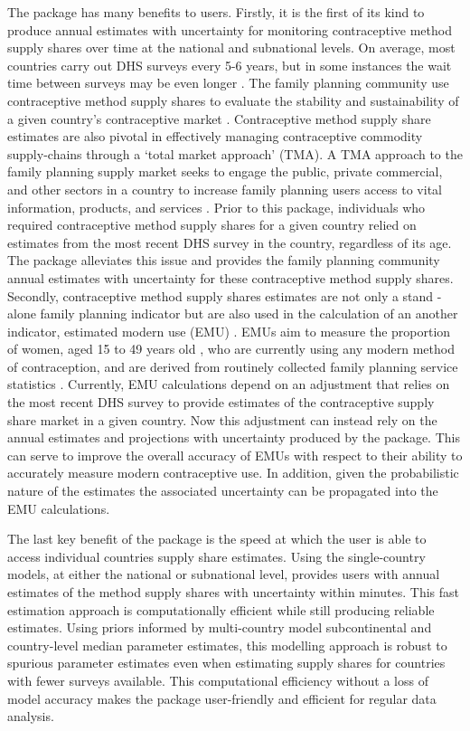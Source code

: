 The  package has many benefits to users. Firstly, it is the first of its kind to produce annual estimates with uncertainty for monitoring contraceptive method supply shares over time at the national and subnational levels. On average, most countries carry out DHS surveys every 5-6 years, but in some instances the wait time between surveys may be even longer \citep{DHSTypes}. The family planning community use contraceptive method supply shares to evaluate the stability and sustainability of a given country's contraceptive market \citep{Bradley2022}. Contraceptive method supply share estimates are also pivotal in effectively managing contraceptive commodity supply-chains through a `total market approach' (TMA). A TMA approach to the family planning supply market seeks to engage the public, private commercial, and other sectors in a country to increase family planning users access to vital information, products, and services \citep{Moazzam2015, SHOPSTMA2016}. Prior to this package, individuals who required contraceptive method supply shares for a given country relied on estimates from the most recent DHS survey in the country, regardless of its age. The  package alleviates this issue and provides the family planning community annual estimates with uncertainty for these contraceptive method supply shares. Secondly, contraceptive method supply shares estimates are not only a stand -alone family planning indicator but are also used in the calculation of an another indicator, estimated modern use (EMU) \citep{Track20}. EMUs aim to measure the proportion of women, aged 15 to 49 years old , who are currently using any modern method of contraception, and are derived from routinely collected family planning service statistics \citep{Track20MonitoringEMUs}. Currently, EMU calculations depend on an adjustment that relies on the most recent DHS survey to provide estimates of the contraceptive supply share market in a given country. Now this adjustment can instead rely on the annual estimates and projections with uncertainty produced by the  package. This can serve to improve the overall accuracy of EMUs with respect to their ability to accurately measure modern contraceptive use. In addition, given the probabilistic nature of the  estimates the associated uncertainty can be propagated into the EMU calculations.

The last key benefit of the  package is the speed at which the user is able to access individual countries supply share estimates. Using the single-country models, at either the national or subnational level, provides users with annual estimates of the method supply shares with uncertainty within minutes. This fast estimation approach is computationally efficient while still producing reliable estimates. Using priors informed by multi-country model subcontinental and country-level median parameter estimates, this modelling approach is robust to spurious parameter estimates even when estimating supply shares for countries with fewer surveys available. This computational efficiency without a loss of model accuracy makes the  package user-friendly and efficient for regular data analysis.

